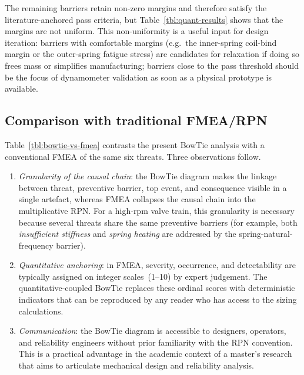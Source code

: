 The remaining barriers retain non-zero margins and therefore satisfy
the literature-anchored pass criteria, but Table~\ref{tbl:quant-results}
shows that the margins are not uniform. This non-uniformity is a useful
input for design iteration: barriers with comfortable margins (e.g.\
the inner-spring coil-bind margin or the outer-spring fatigue stress)
are candidates for relaxation if doing so frees mass or simplifies
manufacturing; barriers close to the pass threshold should be the focus
of dynamometer validation as soon as a physical prototype is available.

\subsection{Comparison with traditional FMEA/RPN}
\label{sec:disc-fmea-comparison}

Table~\ref{tbl:bowtie-vs-fmea} contrasts the present BowTie analysis
with a conventional FMEA of the same six threats. Three observations
follow.

\begin{enumerate}
\item \emph{Granularity of the causal chain}: the BowTie diagram makes
the linkage between threat, preventive barrier, top event, and
consequence visible in a single artefact, whereas FMEA collapses the
causal chain into the multiplicative RPN. For a high-rpm valve train,
this granularity is necessary because several threats share the same
preventive barriers (for example, both \emph{insufficient stiffness}
and \emph{spring heating} are addressed by the spring-natural-frequency
barrier).
\item \emph{Quantitative anchoring}: in FMEA, severity, occurrence, and
detectability are typically assigned on integer scales~(1--10) by
expert judgement. The quantitative-coupled BowTie replaces these
ordinal scores with deterministic indicators that can be reproduced by
any reader who has access to the sizing calculations.
\item \emph{Communication}: the BowTie diagram is accessible to
designers, operators, and reliability engineers without prior
familiarity with the RPN convention. This is a practical advantage in
the academic context of a master's research that aims to articulate
mechanical design and reliability analysis.
\end{enumerate}

